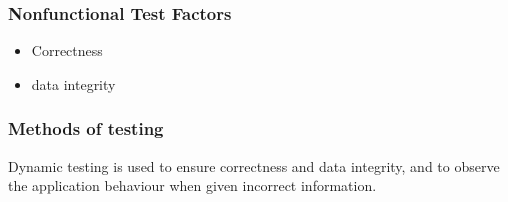 \documentclass[12pt]{article}
\begin{document}
\subsubsection{Nonfunctional Test Factors}
\begin{itemize}
  \item Correctness
  \item data integrity
\end{itemize}

\subsubsection{Methods of testing}
Dynamic testing is used to ensure correctness and data integrity, and to observe the application behaviour when given incorrect information.
\end{document}
